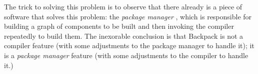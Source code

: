 The trick to solving this problem is to observe that there already is a
piece of software that solves this problem: the \emph{package manager}
,  which is
responsible for building a graph of components to be built and then
invoking the compiler repeatedly to build them.  The inexorable
conclusion is that Backpack is not a compiler feature (with some
adjustments to the package manager to handle it); it is a \emph{package
manager} feature (with some adjustments to the compiler to handle it.)

